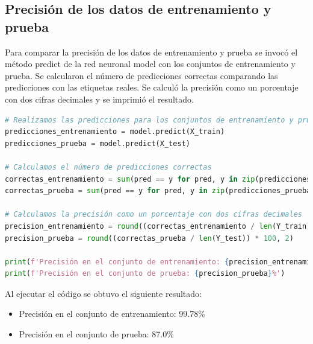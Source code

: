 \documentclass{article}
\begin{document}
    \subsection{Precisión de los datos de entrenamiento y prueba}\label{subsec:presicion-de-los-datos-de-entrenamiento-y-prueba}
    Para comparar la precisión de los datos de entrenamiento y prueba se invocó el método predict de la red neuronal model con los conjuntos de entrenamiento y prueba.
    Se calcularon el número de predicciones correctas comparando las predicciones con las etiquetas reales.
    Se calculó la precisión como un porcentaje con dos cifras decimales y se imprimió el resultado.
    \begin{lstlisting}[language=Python, caption={Presición de los datos de entrenamiento y prueba}, label={lst:presicion}]
# Realizamos las predicciones para los conjuntos de entrenamiento y prueba
predicciones_entrenamiento = model.predict(X_train)
predicciones_prueba = model.predict(X_test)

# Calculamos el número de predicciones correctas
correctas_entrenamiento = sum(pred == y for pred, y in zip(predicciones_entrenamiento, Y_train))
correctas_prueba = sum(pred == y for pred, y in zip(predicciones_prueba, Y_test))

# Calculamos la precisión como un porcentaje con dos cifras decimales
precision_entrenamiento = round((correctas_entrenamiento / len(Y_train)) * 100, 2)
precision_prueba = round((correctas_prueba / len(Y_test)) * 100, 2)

print(f'Precisión en el conjunto de entrenamiento: {precision_entrenamiento}%')
print(f'Precisión en el conjunto de prueba: {precision_prueba}%')
    \end{lstlisting}
    Al ejecutar el código se obtuvo el siguiente resultado:
    \begin{itemize}
        \item Precisión en el conjunto de entrenamiento: 99.78\%
        \item Precisión en el conjunto de prueba: 87.0\%
    \end{itemize}
\end{document}
